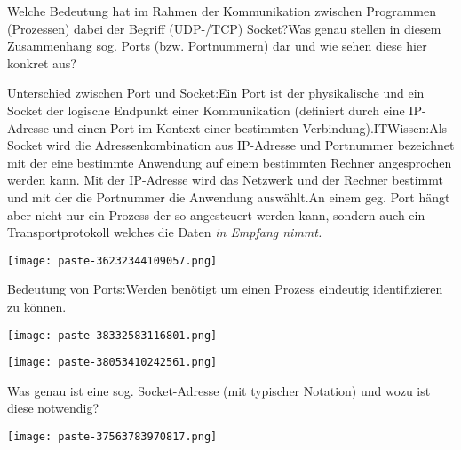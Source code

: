 \documentclass{article}
\begin{document}
\begin{tcolorbox}[colback=white!10!white,colframe=lightgray!75!black,
  savelowerto=\jobname_ex.tex,breakable,enhanced,lines before break=40]

\justifying
Welche Bedeutung hat im Rahmen der Kommunikation zwischen Programmen (Prozessen) dabei der Begriff (UDP-/TCP) Socket?Was genau stellen in diesem Zusammenhang sog. Ports (bzw. Portnummern) dar und wie sehen diese hier konkret aus?

\tcblower

\justifying
Unterschied zwischen Port und Socket:Ein Port ist der physikalische und ein Socket der logische Endpunkt einer Kommunikation (definiert durch eine IP-Adresse und einen Port im Kontext einer bestimmten Verbindung).\textbf{}ITWissen:Als Socket wird die Adressenkombination aus IP-Adresse und Portnummer bezeichnet mit der eine bestimmte Anwendung auf einem bestimmten Rechner angesprochen werden kann. Mit der IP-Adresse wird das Netzwerk und der Rechner bestimmt und mit der die Portnummer die Anwendung auswählt.An einem geg. Port hängt aber nicht nur ein Prozess der so angesteuert werden kann, sondern auch ein Transportprotokoll welches die Daten \textit{in Empfang nimmt.}\begin{center}
\texttt{[image: paste-36232344109057.png]}
\end{center}
Bedeutung von Ports:Werden benötigt um einen Prozess eindeutig identifizieren zu können.\begin{center}
\texttt{[image: paste-38332583116801.png]}
\end{center}
\begin{center}
\texttt{[image: paste-38053410242561.png]}
\end{center}

\end{tcolorbox}
\begin{tcolorbox}[colback=white!10!white,colframe=lightgray!75!black,
  savelowerto=\jobname_ex.tex,breakable,enhanced,lines before break=40]

\justifying
Was genau ist eine sog. Socket-Adresse (mit typischer Notation) und wozu ist diese notwendig?

\tcblower

\justifying
\begin{center}
\texttt{[image: paste-37563783970817.png]}
\end{center}

\end{tcolorbox}
\end{document}
